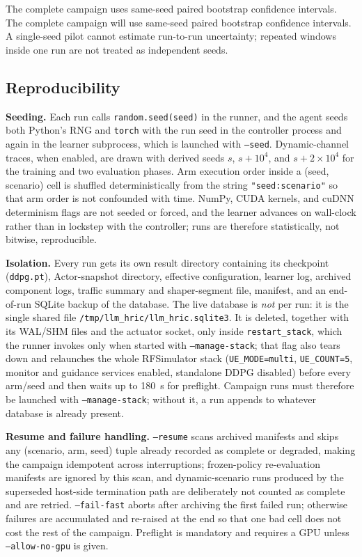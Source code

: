 \ifFullCampaign
The complete campaign uses same-seed paired bootstrap confidence intervals.
\else
The complete campaign will use same-seed paired bootstrap confidence intervals.
\fi
A single-seed pilot cannot estimate run-to-run uncertainty; repeated windows inside one run
are not treated as independent seeds.

\subsection{Reproducibility}
\textbf{Seeding.} Each run calls \texttt{random.seed(seed)} in the runner, and the agent seeds
both Python's RNG and \texttt{torch} with the run seed in the controller process and again in
the learner subprocess, which is launched with \texttt{--seed}. Dynamic-channel traces, when
enabled, are drawn with derived seeds $s$, $s+10^4$, and $s+2\times10^4$ for the training and
two evaluation phases. Arm execution order inside a (seed, scenario) cell is shuffled
deterministically from the string \texttt{"seed:scenario"} so that arm order is not confounded
with time. NumPy, CUDA kernels, and cuDNN determinism flags are not seeded or forced, and the
learner advances on wall-clock rather than in lockstep with the controller; runs are therefore
statistically, not bitwise, reproducible.

\textbf{Isolation.} Every run gets its own result directory containing its checkpoint
(\texttt{ddpg.pt}), Actor-snapshot directory, effective configuration, learner log, archived
component logs, traffic summary and shaper-segment file, manifest, and an end-of-run SQLite
backup of the database. The live database is \emph{not} per run: it is the single shared file
\texttt{/tmp/llm\_hric/llm\_hric.sqlite3}. It is deleted, together with its WAL/SHM files and
the actuator socket, only inside \texttt{restart\_stack}, which the runner invokes only when
started with \texttt{--manage-stack}; that flag also tears down and relaunches the whole
RFSimulator stack (\texttt{UE\_MODE=multi}, \texttt{UE\_COUNT=5}, monitor and guidance
services enabled, standalone DDPG disabled) before every arm/seed and then waits up to 180~s
for preflight. Campaign runs must therefore be launched with \texttt{--manage-stack};
without it, a run appends to whatever database is already present.

\textbf{Resume and failure handling.} \texttt{--resume} scans archived manifests and skips any
(scenario, arm, seed) tuple already recorded as complete or degraded, making the campaign
idempotent across interruptions; frozen-policy re-evaluation manifests are ignored by this
scan, and dynamic-scenario runs produced by the superseded host-side termination path are
deliberately not counted as complete and are retried. \texttt{--fail-fast} aborts after
archiving the first failed run; otherwise failures are accumulated and re-raised at the end so
that one bad cell does not cost the rest of the campaign. Preflight is mandatory and requires
a GPU unless \texttt{--allow-no-gpu} is given.

